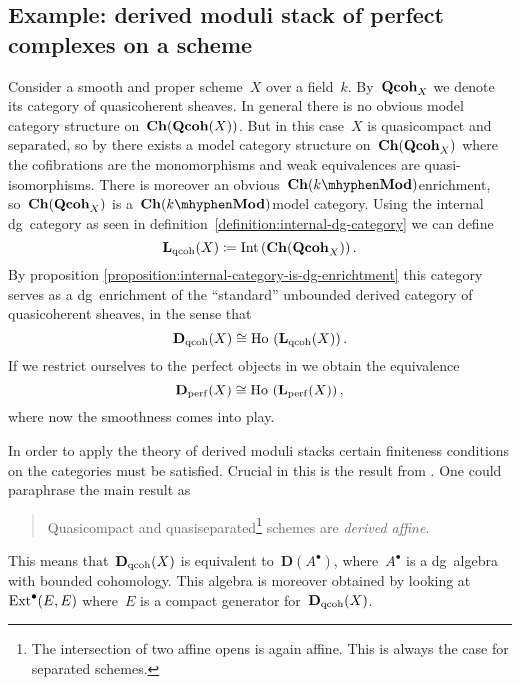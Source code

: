 \begin{refsection}
\section{Example: derived moduli stack of perfect complexes on a scheme}
\label{section:example}
Consider a smooth and proper scheme~$X$ over a field~$k$. By~$\mathbf{Qcoh}_X$ we denote its category of quasicoherent sheaves. In general there is no obvious model category structure on~$\mathbf{Ch}(\mathbf{Qcoh}(X))$. But in this case~$X$ is quasicompact and separated, so by \cite{hovey-sheaves} there exists a model category structure on~$\mathbf{Ch}(\mathbf{Qcoh}_X)$ where the cofibrations are the monomorphisms and weak equivalences are quasi-isomorphisms. There is moreover an obvious~$\Ch(k\mhyphen\Mod)$\dash enrichment, so~$\mathbf{Ch}(\mathbf{Qcoh}_X)$ is a~$\Ch(k\mhyphen\Mod)$\dash model category. Using the internal dg~category as seen in definition~\ref{definition:internal-dg-category} we can define
\begin{equation}
  \mathbf{L}_{\mathrm{qcoh}}(X)\coloneqq\operatorname{Int}\left( \mathbf{Ch}(\mathbf{Qcoh}_X) \right).
\end{equation}
By proposition \ref{proposition:internal-category-is-dg-enrichtment} this category serves as a dg~enrichment of the ``standard'' unbounded derived category of quasicoherent sheaves, in the sense that
\begin{equation}
  \mathbf{D}_{\mathrm{qcoh}}(X)\cong\operatorname{\mathrm{Ho} \,}\left( \mathbf{L}_{\mathrm{qcoh}}(X) \right).
\end{equation}
If we restrict ourselves to the perfect objects in we obtain the equivalence
\begin{equation}
  \mathbf{D}_{\mathrm{perf}}(X)\cong\operatorname{\mathrm{Ho} \,}\left( \mathbf{L}_{\mathrm{perf}}(X) \right),
\end{equation}
where now the smoothness comes into play.

In order to apply the theory of derived moduli stacks certain finiteness conditions on the categories must be satisfied. Crucial in this is the result from \cite{bondal-vandenbergh}. One could paraphrase the main result as
\begin{quote}
  Quasicompact and quasiseparated\footnote{The intersection of two affine opens is again affine. This is always the case for separated schemes.} schemes are \emph{derived affine}.
\end{quote}
\begin{flushright}
  \cite[corollary 3.1.8]{bondal-vandenbergh}
\end{flushright}
This means that~$\mathbf{D}_{\mathrm{qcoh}}(X)$ is equivalent to~$\mathbf{D}(A^\bullet)$, where~$A^\bullet$ is a dg~algebra with bounded cohomology. This algebra is moreover obtained by looking at~$\mathrm{Ext}^\bullet(E,E)$ where~$E$ is a compact generator for~$\mathbf{D}_{\mathrm{qcoh}}(X)$.


\end{refsection}
